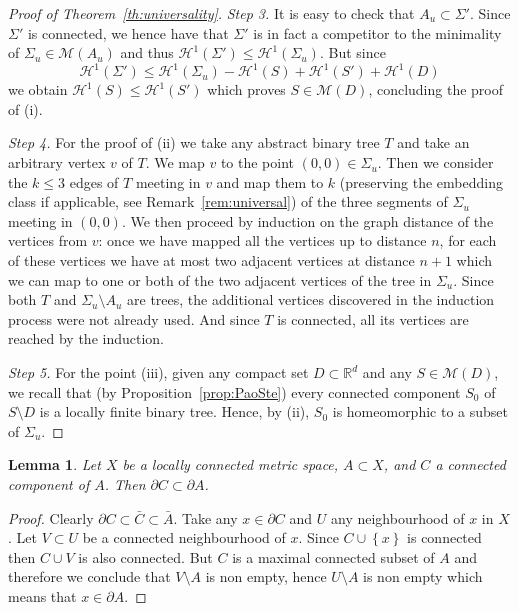\documentclass{amsart}
\newcommand{\RR}{\mathbb R}
\renewcommand{\H}{\mathcal H}
\newcommand{\ENCLOSE}[1]{\left\{#1\right\}}
\newcommand{\M}{\mathcal{M}}
\renewcommand{\H}{\mathcal{H}}
\newtheorem{lemma}[theorem]{Lemma}
\theoremstyle{definition}
\theoremstyle{remark}
\begin{document}
\begin{proof}[Proof of Theorem~\ref{th:universality}]
\emph{Step 3.}
It is easy to check that $A_u\subset \Sigma'$. 
Since $\Sigma'$ is connected, we hence have that $\Sigma'$ is in fact 
a competitor to the minimality of $\Sigma_u\in \M(A_u)$ and thus $\H^1(\Sigma')\le \H^1(\Sigma_u)$.
But since 
\[
  \H^1(\Sigma') \le \H^1(\Sigma_u)-\H^1(S) + \H^1(S') + \H^1(D) 
\]
we obtain $\H^1(S)\le \H^1(S')$ 
which proves $S\in \M(D)$, concluding the proof of (i).

\emph{Step 4.} For the proof of (ii) we take any abstract binary tree $T$ and take an arbitrary 
vertex $v$ of $T$.
We map $v$ to the point $(0,0)\in \Sigma_u$. 
Then we consider the $k\le 3$ edges of $T$ meeting in $v$ and map them 
to $k$ (preserving the embedding class if applicable, see Remark~\ref{rem:universal}) of the three segments of $\Sigma_u$ meeting in $(0,0)$. 
We then proceed by induction on the graph distance of the vertices from $v$: once 
we have mapped all the vertices up to distance $n$, for each of these vertices 
we have at most two adjacent vertices at distance $n+1$ which we can map to one or both of the two 
adjacent vertices of the tree in $\Sigma_u$.
Since both $T$ and $\Sigma_u\setminus A_u$ are trees, 
the additional vertices discovered in the induction process were not already used.
And since $T$ is connected, all its vertices are reached by the induction.

\emph{Step 5.} For the point (iii), given any compact set $D\subset \RR^d$ and any $S\in \M(D)$,
we recall that (by Proposition~\ref{prop:PaoSte}) every connected component $S_0$ 
of $S\setminus D$ is a locally finite binary tree. 
Hence, by (ii), $S_0$ is homeomorphic to a subset of $\Sigma_u$.
\end{proof}

\begin{lemma}\label{lemma_da_fare}
Let $X$ be a locally connected metric space, $A\subset X$, and 
$C$ a connected component of $A$. Then $\partial C \subset \partial A$.
\end{lemma}
\begin{proof}
Clearly $\partial C\subset \bar C\subset \bar A$.
Take any $x\in \partial C$ and $U$ any neighbourhood of $x$ in $X$.
Let $V\subset U$ be a connected neighbourhood of $x$.
Since $C\cup\ENCLOSE{x}$ is connected 
then $C\cup V$ is also connected. But $C$ is a maximal connected subset of $A$ 
and therefore we conclude that $V\setminus A$ is non empty, hence $U\setminus A$ is non empty 
which means that $x\in \partial A$.
\end{proof}
\end{document}
